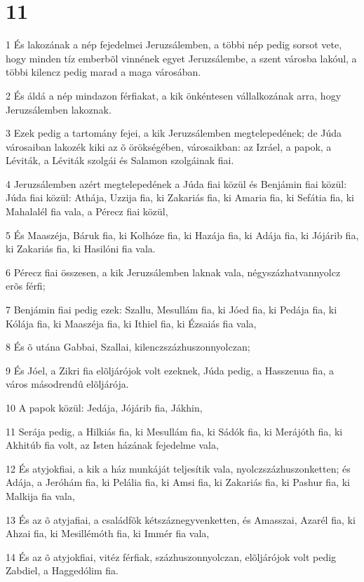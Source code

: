 \chapter{11}

\par 1 És lakozának a nép fejedelmei Jeruzsálemben, a többi nép pedig sorsot vete, hogy minden tíz emberbõl vinnének egyet Jeruzsálembe, a szent városba lakóul, a többi kilencz pedig marad a maga városában.
\par 2 És áldá a nép mindazon férfiakat, a kik önkéntesen vállalkozának arra, hogy Jeruzsálemben lakoznak.
\par 3 Ezek pedig a tartomány fejei, a kik Jeruzsálemben megtelepedének; de Júda városaiban lakozék kiki az õ örökségében, városaikban: az Izráel, a papok, a Léviták, a Léviták szolgái és Salamon szolgáinak fiai.
\par 4 Jeruzsálemben azért megtelepedének a Júda fiai közül és Benjámin fiai közül: Júda fiai közül: Athája, Uzzija fia, ki Zakariás fia, ki Amaria fia, ki Sefátia fia, ki Mahalalél fia vala, a Pérecz fiai közül,
\par 5 És Maaszéja, Báruk fia, ki Kolhóze fia, ki Hazája fia, ki Adája fia, ki Jójárib fia, ki Zakariás fia, ki Hasilóni fia vala.
\par 6 Pérecz fiai összesen, a kik Jeruzsálemben laknak vala, négyszázhatvannyolcz erõs férfi;
\par 7 Benjámin fiai pedig ezek: Szallu, Mesullám fia, ki Jóed fia, ki Pedája fia, ki Kólája fia, ki Maaszéja fia, ki Ithiel fia, ki Ézsaiás fia vala,
\par 8 És õ utána Gabbai, Szallai, kilenczszázhuszonnyolczan;
\par 9 És Jóel, a Zikri fia elõljárójok volt ezeknek, Júda pedig, a Hasszenua fia, a város másodrendû elõljárója.
\par 10 A papok közül: Jedája, Jójárib fia, Jákhin,
\par 11 Serája pedig, a Hilkiás fia, ki Mesullám fia, ki Sádók fia, ki Merájóth fia, ki Akhitúb fia volt, az Isten házának fejedelme vala,
\par 12 És atyjokfiai, a kik a ház munkáját teljesítik vala, nyolczszázhuszonketten; és Adája, a Jeróhám fia, ki Pelália fia, ki Amsi fia, ki Zakariás fia, ki Pashur fia, ki Malkija fia vala,
\par 13 És az õ atyjafiai, a családfõk kétszáznegyvenketten, és Amasszai, Azarél fia, ki Ahzai fia, ki Mesillémóth fia, ki Immér fia vala,
\par 14 És az õ atyjokfiai, vitéz férfiak, százhuszonnyolczan, elõljárójok volt pedig Zabdiel, a Haggedólim fia.
